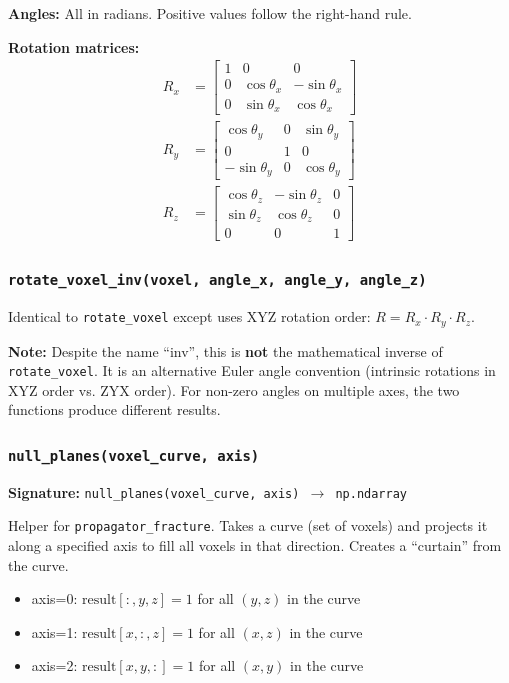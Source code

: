 \documentclass[12pt,a4paper]{article}
\begin{document}
\textbf{Angles:} All in radians. Positive values follow the right-hand rule.

\textbf{Rotation matrices:}
\begin{align*}
R_x &= \begin{bmatrix}1 & 0 & 0 \\ 0 & \cos\theta_x & -\sin\theta_x \\ 0 & \sin\theta_x & \cos\theta_x\end{bmatrix} \\
R_y &= \begin{bmatrix}\cos\theta_y & 0 & \sin\theta_y \\ 0 & 1 & 0 \\ -\sin\theta_y & 0 & \cos\theta_y\end{bmatrix} \\
R_z &= \begin{bmatrix}\cos\theta_z & -\sin\theta_z & 0 \\ \sin\theta_z & \cos\theta_z & 0 \\ 0 & 0 & 1\end{bmatrix}
\end{align*}

\subsubsection{\texttt{rotate\_voxel\_inv(voxel, angle\_x, angle\_y, angle\_z)}}

Identical to \texttt{rotate\_voxel} except uses XYZ rotation order: $R = R_x \cdot R_y \cdot R_z$.

\textbf{Note:} Despite the name ``inv'', this is \textbf{not} the mathematical inverse of \texttt{rotate\_voxel}. It is an alternative Euler angle convention (intrinsic rotations in XYZ order vs. ZYX order). For non-zero angles on multiple axes, the two functions produce different results.

\subsubsection{\texttt{null\_planes(voxel\_curve, axis)}}

\textbf{Signature:} \texttt{null\_planes(voxel\_curve, axis) $\rightarrow$ np.ndarray}

Helper for \texttt{propagator\_fracture}. Takes a curve (set of voxels) and projects it along a specified axis to fill all voxels in that direction. Creates a ``curtain'' from the curve.

\begin{itemize}
  \item axis=0: $\text{result}[:, y, z] = 1$ for all $(y,z)$ in the curve
  \item axis=1: $\text{result}[x, :, z] = 1$ for all $(x,z)$ in the curve
  \item axis=2: $\text{result}[x, y, :] = 1$ for all $(x,y)$ in the curve
\end{itemize}
\end{document}
